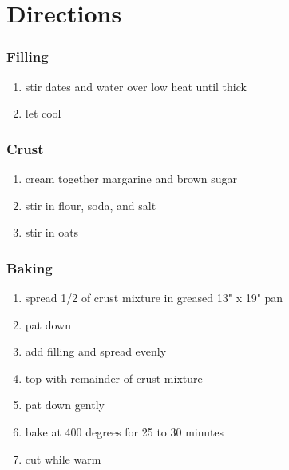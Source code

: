\documentclass{report}
\providecommand{\tightlist}{%
  \setlength{\itemsep}{0pt}\setlength{\parskip}{0pt}}
\begin{document}
\begin{minipage}[t]{0.45\textwidth}\vspace{0pt}


\hypertarget{directions}{%
\section*{Directions}\label{directions}}

\hypertarget{filling}{%
\subsubsection{Filling}\label{filling}}

\begin{enumerate}
\def\labelenumi{\arabic{enumi}.}
\tightlist
\item
  stir dates and water over low heat until thick
\item
  let cool
\end{enumerate}

\hypertarget{crust}{%
\subsubsection{Crust}\label{crust}}

\begin{enumerate}
\def\labelenumi{\arabic{enumi}.}
\tightlist
\item
  cream together margarine and brown sugar
\item
  stir in flour, soda, and salt
\item
  stir in oats
\end{enumerate}

\hypertarget{baking}{%
\subsubsection{Baking}\label{baking}}

\begin{enumerate}
\def\labelenumi{\arabic{enumi}.}
\tightlist
\item
  spread 1/2 of crust mixture in greased 13" x 19" pan
\item
  pat down
\item
  add filling and spread evenly
\item
  top with remainder of crust mixture
\item
  pat down gently
\item
  bake at 400 degrees for 25 to 30 minutes
\item
  cut while warm
\end{enumerate}




\end{minipage}%
\end{document}
